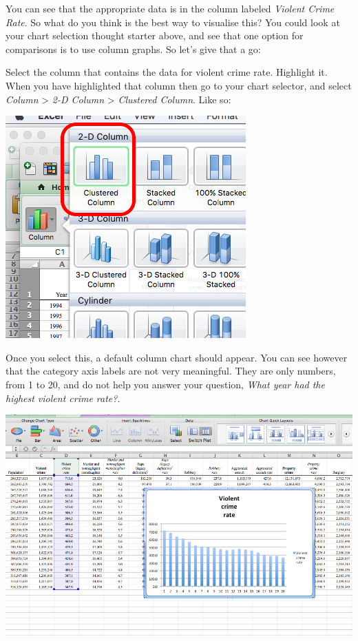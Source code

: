 \documentclass[
]{book}
\begin{document}
You can see that the appropriate data is in the column labeled \emph{Violent Crime Rate}. So what do you think is the best way to visualise this? You could look at your chart selection thought starter above, and see that one option for comparisons is to use column graphs. So let's give that a go:

Select the column that contains the data for violent crime rate. Highlight it. When you have highlighted that column then go to your chart selector, and select \emph{Column} \textgreater{} \emph{2-D Column} \textgreater{} \emph{Clustered Column}. Like so:

\includegraphics{imgs/desc_viz_1.png}

Once you select this, a default column chart should appear. You can see however that the category axis labels are not very meaningful. They are only numbers, from 1 to 20, and do not help you answer your question, \emph{What year had the highest violent crime rate?}.

\includegraphics{imgs/desc_viz_2.png}
\end{document}

